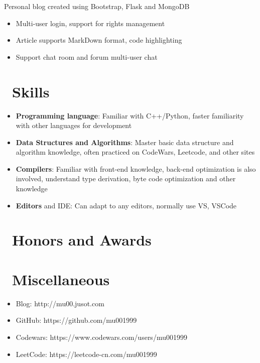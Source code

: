 \documentclass{resume}
\begin{document}
Personal blog created using Bootstrap, Flask and MongoDB
\begin{onehalfspacing}
\begin{itemize}
  \item Multi-user login, support for rights management
  \item Article supports MarkDown format, code highlighting
  \item Support chat room and forum multi-user chat
\end{itemize}
\end{onehalfspacing}


\section{\faCogs\ Skills}
\begin{itemize}[parsep=0.5ex]
  \item \textbf{Programming language}: Familiar with C++/Python, faster familiarity with other languages for development
  \item \textbf{Data Structures and Algorithms}: Master basic data structure and algorithm knowledge, often practiced on CodeWars, Leetcode, and other sites
  \item \textbf{Compilers}: Familiar with front-end knowledge, back-end optimization is also involved, understand type derivation, byte code optimization and other knowledge
  \item \textbf{Editors} and IDE: Can adapt to any editors, normally use VS, VSCode
\end{itemize}

\section{\faHeartO\ Honors and Awards}

\section{\faInfo\ Miscellaneous}
\begin{itemize}[parsep=0.5ex]
  \item Blog: http://mu00.jusot.com
  \item GitHub: https://github.com/mu001999
  \item Codewars: https://www.codewars.com/users/mu001999
\item LeetCode: https://leetcode-cn.com/mu001999
\end{itemize}

%
%
\end{document}

